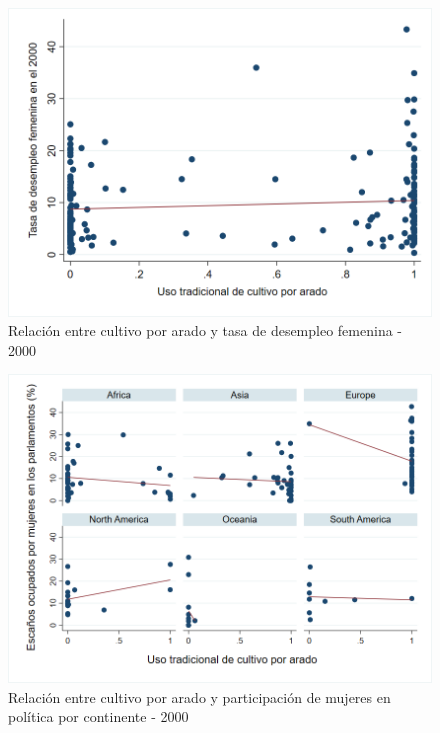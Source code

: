 \documentclass[11pt,a4paper]{article}
\begin{document}
\begin{figure}[!h]
    \centering
    \includegraphics[width=15cm]{Graph/Graph 3.png}
   \caption{Relación entre cultivo por arado y tasa de desempleo femenina - 2000}
    \label{fig:my_label}
\end{figure}

\begin{figure}[!h]
    \centering
    \includegraphics[width=15cm]{Graph/Graph 4.png}
   \caption{Relación entre cultivo por arado y participación de mujeres en política por continente - 2000}
    \label{fig:my_label}
\end{figure}
\end{document}
